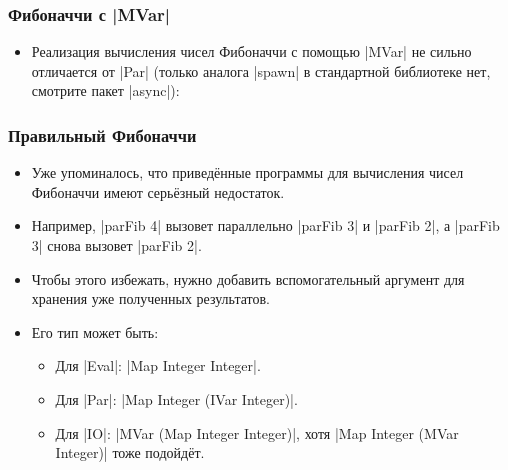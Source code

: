 \documentclass[11pt]{beamer}
\begin{document}
\begin{frame}[fragile]
  \frametitle{Фибоначчи с \haskinline|MVar|}
  \begin{itemize}
    \item Реализация вычисления чисел Фибоначчи с помощью \haskinline|MVar| не сильно отличается от \haskinline|Par| (только аналога \haskinline|spawn| в стандартной библиотеке нет, смотрите пакет \haskinline|async|):
  \end{itemize}
\end{frame}

\begin{frame}[fragile]
  \frametitle{Правильный Фибоначчи}
  \begin{itemize}
    \item Уже упоминалось, что приведённые программы для вычисления чисел Фибоначчи имеют серьёзный недостаток.
    \item Например, \haskinline|parFib 4| вызовет параллельно \haskinline|parFib 3| и \haskinline|parFib 2|, а \haskinline|parFib 3| снова вызовет \haskinline|parFib 2|.
    \item Чтобы этого избежать, нужно добавить вспомогательный аргумент для хранения уже полученных результатов.
    \item Его тип может быть:
          \begin{itemize}
            \item Для \haskinline|Eval|: \haskinline|Map Integer Integer|.
            \item Для \haskinline|Par|: \haskinline|Map Integer (IVar Integer)|.
            \item Для \haskinline|IO|: \haskinline|MVar (Map Integer Integer)|, хотя \haskinline|Map Integer (MVar Integer)| тоже подойдёт.
          \end{itemize}
  \end{itemize}
\end{frame}
\end{document}
